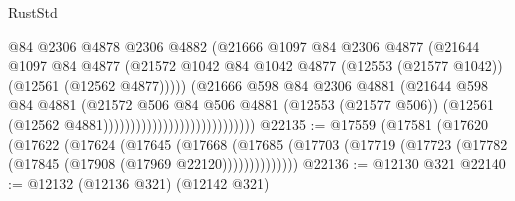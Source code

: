 \begin{lexlean}{RustStd}
\begin{coremodule}
                                                  @84
                                                  @2306
                                                  @4878
                                                  @2306
                                                  @4882
                                                  (@21666
                                                    @1097
                                                    @84
                                                    @2306
                                                    @4877
                                                    (@21644
                                                      @1097
                                                      @84
                                                      @4877
                                                      (@21572
                                                        @1042
                                                        @84
                                                        @1042
                                                        @4877
                                                        (@12553 (@21577 @1042))
                                                        (@12561 (@12562 @4877)))))
                                                  (@21666
                                                    @598
                                                    @84
                                                    @2306
                                                    @4881
                                                    (@21644
                                                      @598
                                                      @84
                                                      @4881
                                                      (@21572
                                                        @506
                                                        @84
                                                        @506
                                                        @4881
                                                        (@12553 (@21577 @506))
                                                        (@12561
                                                          (@12562 @4881))))))))))))))))))))))))))))
@22135 := @17559
    (@17581
      (@17620
        (@17622
          (@17624
            (@17645
              (@17668
                (@17685 (@17703 (@17719 (@17723 (@17782 (@17845 (@17908 (@17969 @22120))))))))))))))
@22136 := @12130 @321
@22140 := @12132 (@12136 @321) (@12142 @321)

\end{coremodule}
\end{lexlean}
